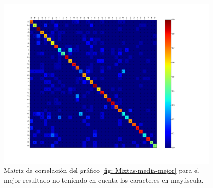 			\begin{figure}[!htbp]
				\centerline{\includegraphics[scale=0.4]{img/resultados/mixtas/best_mean_matrix_Alpha0,01_2040-4_ins.png}}
				\caption[Matriz de correlación ``case insensitive'' para mixtas media]{Matriz de correlación del gráfico \ref{fig: Mixtas-media-mejor} para el mejor resultado no teniendo en cuenta los caracteres en mayúscula.}
				\label{fig: MatrizIns-Mixtas-media-mejor}
			\end{figure}
